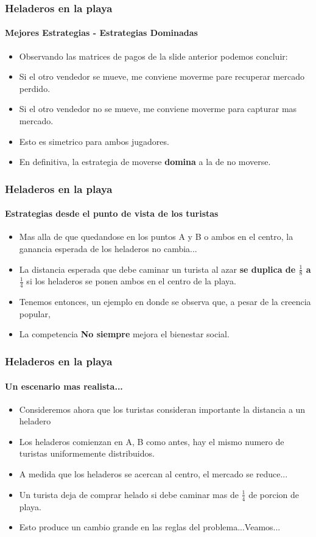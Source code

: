 \documentclass{beamer}
\begin{document}
\begin{frame}
  \frametitle{Heladeros en la playa}
  \framesubtitle{Mejores Estrategias - Estrategias Dominadas}
  \begin{itemize}
    \setlength{\itemsep}{4pt}
    \item Observando las matrices de pagos de la slide anterior podemos concluir:
    \pause    
    \item Si el otro vendedor se mueve, me conviene moverme pare recuperar mercado perdido.
    \pause
    \item Si el otro vendedor no se mueve, me conviene moverme para capturar mas mercado.
    \pause
    \item Esto es simetrico para ambos jugadores.
    \pause
    \item En definitiva, la estrategia de moverse \textbf{domina} a la de no moverse.
  \end{itemize}
\end{frame}

\begin{frame}
  \frametitle{Heladeros en la playa}
  \framesubtitle{Estrategias desde el punto de vista de los turistas}
  \begin{itemize}
    \setlength{\itemsep}{4pt}
    \item Mas alla de que quedandose en los puntos A y B o ambos en el centro, la ganancia esperada de los heladeros no cambia...
    \pause
    \item La distancia esperada que debe caminar un turista al azar \textbf{se duplica de $\frac{1}{8}$ a $\frac{1}{4}$} si los heladeros se ponen ambos en el centro de la playa.
    \pause
    \item Tenemos entonces, un ejemplo en donde se observa que, a pesar de la creencia popular,
    \pause
    \item La competencia \textbf{No siempre} mejora el bienestar social. 
  \end{itemize}
\end{frame}

\begin{frame}
  \frametitle{Heladeros en la playa}
  \framesubtitle{Un escenario mas realista...}
  \begin{itemize}
    \setlength{\itemsep}{4pt}
    \item Consideremos ahora que los turistas consideran importante la distancia a un heladero
    \pause
    \item Los heladeros comienzan en A, B como antes, hay el mismo numero de turistas uniformemente distribuidos.
    \pause
    \item A medida que los heladeros se acercan al centro, el mercado se reduce...
    \pause
    \item Un turista deja de comprar helado si debe caminar mas de $\frac{1}{4}$ de porcion de playa.
    \pause
    \item Esto produce un cambio grande en las reglas del problema...Veamos...
  \end{itemize}
\end{frame}
\end{document}
